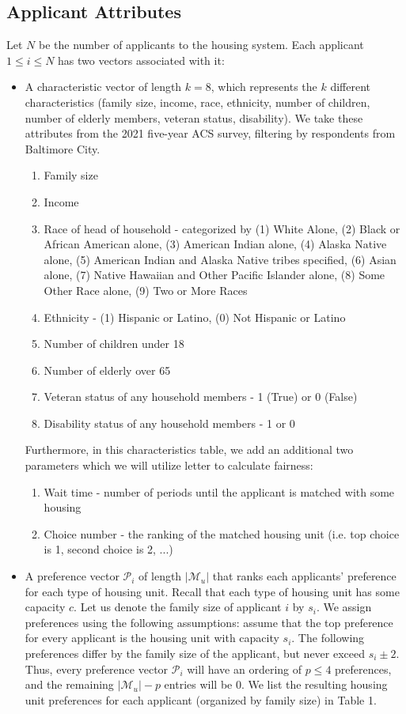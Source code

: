 \documentclass[11pt]{article}
\begin{document}
\subsection{Applicant Attributes}
\label{3.2}
Let $N$ be the number of applicants to the housing system. Each applicant $1 \leq i \leq N$ has two vectors associated with it: 
\begin{itemize}
    \item A characteristic vector of length $k = 8$, which represents the $k$ different characteristics (family size, income, race, ethnicity, number of children, number of elderly members, veteran status, disability). We take these attributes from the 2021 five-year ACS survey, filtering by respondents from Baltimore City.
    \begin{enumerate}
        \item Family size 
        \item Income
        \item Race of head of household - categorized by (1) White Alone, (2) Black or African American alone, (3) American Indian alone, (4) Alaska Native alone, (5) American Indian and Alaska Native tribes specified, (6) Asian alone, (7) Native Hawaiian and Other Pacific Islander alone, (8) Some Other Race alone, (9) Two or More Races
        \item Ethnicity - (1) Hispanic or Latino, (0) Not Hispanic or Latino
        \item Number of children under 18
        \item Number of elderly over 65
        \item Veteran status of any household members - 1 (True) or 0 (False)
        \item Disability status of any household members - 1 or 0
    \end{enumerate}
    Furthermore, in this characteristics table, we add an additional two parameters which we will utilize letter to calculate fairness:
    \begin{enumerate}
        \item Wait time - number of periods until the applicant is matched with some housing
        \item Choice number - the ranking of the matched housing unit (i.e. top choice is 1, second choice is 2, ...)
    \end{enumerate}
    \item A preference vector $\mathcal{P}_i$ of length $|\mathcal{M}_u|$ that ranks each applicants' preference for each type of housing unit. Recall that each type of housing unit has some capacity $c$. Let us denote the family size of applicant $i$ by $s_i$. We assign preferences using the following assumptions: assume that the top preference for every applicant is the housing unit with capacity $s_i$. The following preferences differ by the family size of the applicant, but never exceed $s_i \pm 2$. Thus, every preference vector $\mathcal{P}_i$ will have an ordering of $p \leq 4$ preferences, and the remaining $|\mathcal{M}_u| - p$ entries will be 0. We list the resulting housing unit preferences for each applicant (organized by family size) in Table 1.

\end{itemize}
\end{document}
